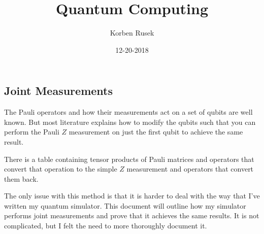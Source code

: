 \documentclass{article}
\author{Korben Rusek}
\title{Quantum Computing}
\date{12-20-2018}
\begin{document}
  \maketitle
  \newcommand{\gindex}[2]{|#1\!:\!#2|}
  \newcommand{\lcm}{\textrm{lcm}}
  \newcommand{\irr}{\textrm{irr}}
  \newcommand{\sylp}{$Syl_{p}$}
  \newcommand{\phnt}[1]{$\phantom{1}^{#1}$}
  \newcommand{\gen}[1]{\langle#1\rangle}
  \newcommand{\BN}{\mathbb{N}}
  \newcommand{\BZ}{\mathbb{Z}}
  \newcommand{\BQ}{\mathbb{Q}}
  \newcommand{\BR}{\mathbb{R}}
  \newcommand{\BC}{\mathbb{C}}
  \newcommand{\BF}{\mathbb{F}}
  \newcommand{\CF}{\mathcal{F}}
  \newcommand{\CQ}{\mathcal{Q}}
  \newcommand{\fa}{\mathfrak{a}}
  \newcommand{\fb}{\mathfrak{b}}
  \newcommand{\fp}{\mathfrak{p}}
  \newcommand{\fq}{\mathfrak{q}}
  \newcommand{\fm}{\mathfrak{m}}
  \newcommand{\FN}{\mathfrak{N}}
  \newcommand{\FR}{\mathfrak{R}}
  \newcommand{\set}[1]{\{#1\}}
  \newcommand{\trv}{\set{1}}
  \newcommand{\Aut}{\mathrm{Aut}}
  \newcommand{\End}{\mathrm{End}}
  \newcommand{\Ker}{\mathrm{Ker}}
  \newcommand{\chr}{\mathrm{char}}

  \theoremstyle{definition}
  \newtheorem{theorem}{Theorem}[section]
  \newtheorem{corollary}[theorem]{Corollary}
  \newtheorem{definition}[theorem]{Definition}
  \newtheorem{lemma}[theorem]{Lemma}
  \newtheorem{fact}[theorem]{Fact}
  \newtheorem{exercise}{Exercise}[section]
  \newtheorem{example}{Example}[section]

  \setcounter{section}{1}
  \setcounter{subsection}{1}

\subsection{Joint Measurements}

The Pauli operators and how their measurements act on a 
set of qubits are well known. But most literature explains
how to modify the qubits such that you can perform the
Pauli $Z$ measurement on just the first qubit to achieve
the same result. 

There is a table containing tensor products of Pauli matrices
and operators that convert that operation to the simple $Z$
measurement and operators that convert them back.

The only issue with this method is that
it is harder to deal with the way that I've written my
quantum simulator. This document will outline how my 
simulator performs joint measurements and prove that it 
achieves the same results. It is not complicated, but I 
felt the need to more thoroughly document it.
\end{document}
